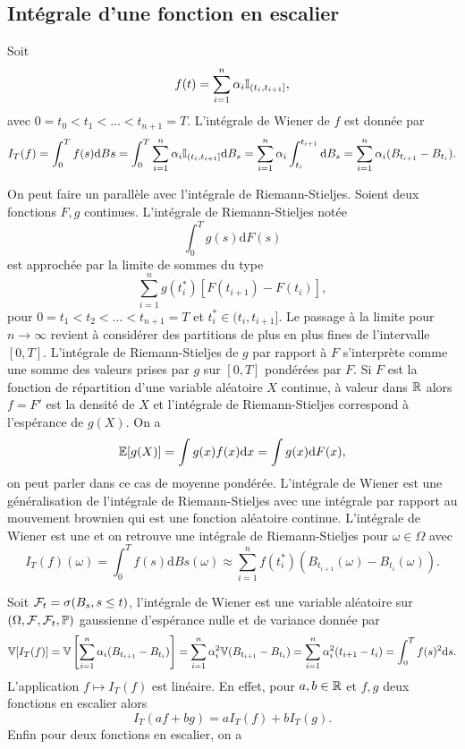 \subsection{Intégrale d'une fonction en escalier}\label{eq:esc}
Soit 
$$
f(t) = \sum_{i=1}^n\alpha_i\mathbb{I}_{(t_i, t_{i+1}]},
$$
avec $0=t_0<t_1<\ldots <t_{n+1} = T$. L'intégrale de Wiener de $f$ est donnée par 
$$
I_T(f) = \int_0^Tf(s)\text{d}Bs = \int_0^T\sum_{i=1}^n\alpha_i\mathbb{I}_{(t_i, t_{i+1}]}\text{d}B_s = \sum_{i=1}^n\alpha_i\int_{t_i}^{t_{i+1}} \text{d}B_s = \sum_{i=1}^n\alpha_i (B_{t_{i+1}} - B_{t_i}).
$$
\begin{remark}\label{rem:integrale_Riemann_Stieljes}
On peut faire un parallèle avec l'intégrale de Riemann-Stieljes. Soient deux fonctions $F, g$ continues. L'intégrale de Riemann-Stieljes notée 
$$
\int_0^Tg(s)\text{d}F(s)
$$
est approchée par la limite de sommes du type
$$
\sum_{i=1}^{n}g(t_i^\ast)[F(t_{i+1})-F(t_{i})],
$$
pour $0=t_1<t_2<\ldots < t_{n+1} = T$ et $t_i^\ast\in(t_i,t_{i+1}]$. Le passage à la limite pour $n\rightarrow \infty$ revient à considérer des partitions de plus en plus fines de l'intervalle $[0,T]$. L'intégrale de Riemann-Stieljes de $g$ par rapport à $F$ s'interprète comme une somme des valeurs prises par $g$ sur $[0,T]$ pondérées par $F$. Si $F$ est la fonction de répartition d'une variable aléatoire $X$ continue, à valeur dans $\mathbb{R}$ alors $f=F'$ est la densité de $X$ et l'intégrale de Riemann-Stieljes correspond à l'espérance de $g(X)$. On a 
$$
\mathbb{E}[g(X)] = \int g(x)f(x)\text{d}x=\int g(x)\text{d}F(x),
$$
on peut parler dans ce cas de moyenne pondérée. L'intégrale de Wiener est une généralisation de l'intégrale de Riemann-Stieljes avec une intégrale par rapport au mouvement brownien qui est une fonction aléatoire continue. L'intégrale de Wiener est une \va et on retrouve une intégrale de Riemann-Stieljes pour $\omega\in\Omega$ avec 
$$
I_T(f)(\omega) =\int_0^Tf(s)\text{d}Bs(\omega) \approx \sum_{i=1}^nf(t_{i}^\ast) (B_{t_{i+1}}(\omega) - B_{t_i}(\omega)).
$$
\end{remark}
Soit $\mathcal{F}_t = \sigma(B_s,s\leq t)$, l'intégrale de Wiener est une variable aléatoire sur $(\Omega, \mathcal{F},\mathcal{F}_t, \mathbb{P} )$ gaussienne d'espérance nulle et de variance donnée par
$$
\mathbb{V}[I_T(f)]= \mathbb{V}\left[\sum_{i=1}^n\alpha_i (B_{t_{i+1}} - B_{t_i})\right] = \sum_{i=1}^n\alpha_i^2 \mathbb{V}(B_{t_{i+1}} - B_{t_i}) = \sum_{i=1}^n\alpha_i^2 (t_{i+1} - t_i)= \int_0^T f(s)^2\text{d}s.
$$
L'application $f\mapsto I_T(f)$ est linéaire. En effet, pour $a,b\in \mathbb{R}$ et $f,g$ deux fonctions en escalier alors 
$$
I_T(af+bg) = aI_T(f)+ bI_T(g).
$$
Enfin pour deux fonctions en escalier, on a 
